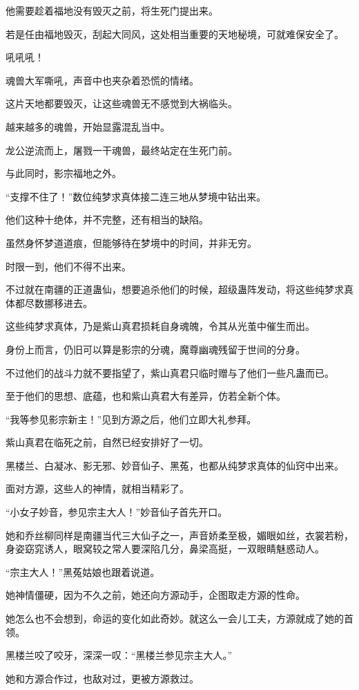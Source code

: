 \begin{this_body}
他需要趁着福地没有毁灭之前，将生死门提出来。

若是任由福地毁灭，刮起大同风，这处相当重要的天地秘境，可就难保安全了。

吼吼吼！

魂兽大军嘶吼，声音中也夹杂着恐慌的情绪。

这片天地都要毁灭，让这些魂兽无不感觉到大祸临头。

越来越多的魂兽，开始显露混乱当中。

龙公逆流而上，屠戮一干魂兽，最终站定在生死门前。

与此同时，影宗福地之外。

“支撑不住了！”数位纯梦求真体接二连三地从梦境中钻出来。

他们这种十绝体，并不完整，还有相当的缺陷。

虽然身怀梦道道痕，但能够待在梦境中的时间，并非无穷。

时限一到，他们不得不出来。

不过就在南疆的正道蛊仙，想要追杀他们的时候，超级蛊阵发动，将这些纯梦求真体都尽数挪移进去。

这些纯梦求真体，乃是紫山真君损耗自身魂魄，令其从光茧中催生而出。

身份上而言，仍旧可以算是影宗的分魂，魔尊幽魂残留于世间的分身。

不过他们的战斗力就不要指望了，紫山真君只临时赠与了他们一些凡蛊而已。

至于他们的思想、底蕴，也和紫山真君大有差异，仿若全新个体。

“我等参见影宗新主！”见到方源之后，他们立即大礼参拜。

紫山真君在临死之前，自然已经安排好了一切。

黑楼兰、白凝冰、影无邪、妙音仙子、黑菟，也都从纯梦求真体的仙窍中出来。

面对方源，这些人的神情，就相当精彩了。

“小女子妙音，参见宗主大人！”妙音仙子首先开口。

她和乔丝柳同样是南疆当代三大仙子之一，声音娇柔至极，媚眼如丝，衣裳若粉，身姿窈窕诱人，眼窝较之常人要深陷几分，鼻梁高挺，一双眼睛魅惑动人。

“宗主大人！”黑菟姑娘也跟着说道。

她神情僵硬，因为不久之前，她还向方源动手，企图取走方源的性命。

她怎么也不会想到，命运的变化如此奇妙。就这么一会儿工夫，方源就成了她的首领。

黑楼兰咬了咬牙，深深一叹：“黑楼兰参见宗主大人。”

她和方源合作过，也敌对过，更被方源救过。


\end{this_body}

